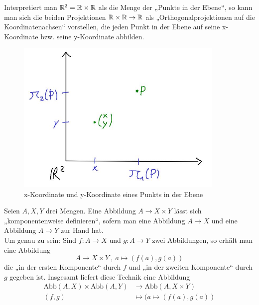 \begin{bsp}
 Interpretiert man ${\mathbb R}^2={\mathbb R}\times {\mathbb R}$ als die Menge der „Punkte in der Ebene“, so kann man sich die beiden Projektionen ${\mathbb R}\times {\mathbb R} \to {\mathbb R}$ als „Orthogonalprojektionen auf die Koordinatenachsen“ vorstellen, die jeden Punkt in der Ebene auf seine x-Koordinate bzw. seine y-Koordinate abbilden.
     \begin{figure}[H]
\begin{center}
\includegraphics[width=10cm]{./_img/Projektion.jpeg}
\end{center}
\centering \caption{x-Koordinate und y-Koordinate eines Punkts in der Ebene}
\end{figure}
\end{bsp}

\begin{bem}
Seien $A,X,Y$ drei Mengen. Eine Abbildung $A\to X\times Y$ lässt sich „komponentenweise definieren“, sofern man eine Abbildung $A\to X$ und eine Abbildung $A\to Y$ zur Hand hat. \\
Um genau zu sein: Sind $f:A\to X$ und $g:A\to Y$ zwei Abbildungen, so erhält man eine Abbildung
\[ A \to X\times Y \ ,\ a \mapsto (f(a),g(a)) \]
die „in der ersten Komponente“ durch $f$ und „in der zweiten Komponente“ durch $g$ gegeben ist. Insgesamt liefert diese Technik eine Abbildung
\begin{align*}
  \text{Abb}(A,X)\times \text{Abb}(A,Y) & \to \text{Abb}(A,X\times Y) \\
  (f,g) & \mapsto (a \mapsto (f(a),g(a))
\end{align*}
\end{bem}

